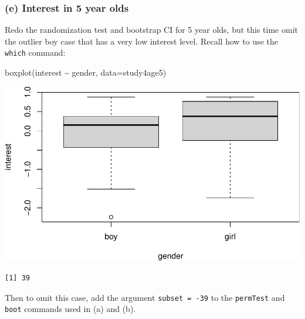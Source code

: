 \documentclass[
]{book}
\newenvironment{Shaded}{\begin{snugshade}}{\end{snugshade}}
\newcommand{\AttributeTok}[1]{\textcolor[rgb]{0.77,0.63,0.00}{#1}}
\newcommand{\DecValTok}[1]{\textcolor[rgb]{0.00,0.00,0.81}{#1}}
\newcommand{\FunctionTok}[1]{\textcolor[rgb]{0.00,0.00,0.00}{#1}}
\newcommand{\NormalTok}[1]{#1}
\newcommand{\SpecialCharTok}[1]{\textcolor[rgb]{0.00,0.00,0.00}{#1}}
\begin{document}
\hypertarget{e-interest-in-5-year-olds}{%
\subsubsection{(e) Interest in 5 year olds}\label{e-interest-in-5-year-olds}}

Redo the randomization test and bootstrap CI for 5 year olds, but this time omit the outlier boy case that has a very low interest level. Recall how to use the \texttt{which} command:

\begin{Shaded}
\begin{Highlighting}[]
\FunctionTok{boxplot}\NormalTok{(interest }\SpecialCharTok{\textasciitilde{}}\NormalTok{ gender, }\AttributeTok{data=}\NormalTok{study4age5)}
\end{Highlighting}
\end{Shaded}

\includegraphics[width=1\linewidth]{Class_Activity_14_files/figure-latex/unnamed-chunk-12-1}

\begin{Shaded}
\end{Shaded}

\begin{verbatim}
[1] 39
\end{verbatim}

Then to omit this case, add the argument \texttt{subset\ =\ -39} to the \texttt{permTest} and \texttt{boot} commands used in (a) and (b).
\end{document}
